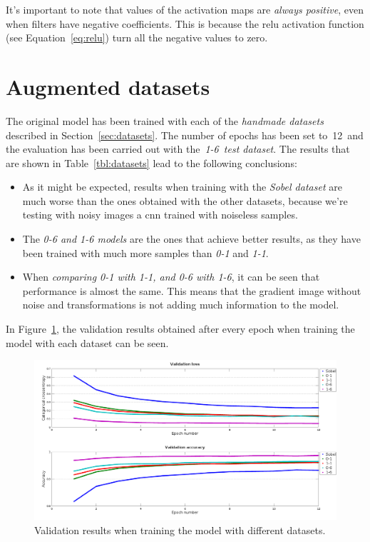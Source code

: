 It's important to note that values of the activation maps are \emph{always positive}, even when filters have negative coefficients. This is because the \gls{relu} activation function (see Equation~\ref{eq:relu}) turn all the negative values to zero.

\section{Augmented datasets}\label{sec:new_datasets}
The original model has been trained with each of the \emph{handmade datasets} described in Section~\ref{sec:datasets}. The number of epochs has been set to~12~and the evaluation has been carried out with the~\emph{1-6~test dataset}. The results that are shown in Table~\ref{tbl:datasets} lead to the following conclusions:
\begin{itemize}
	\item As it might be expected, results when training with the \emph{Sobel dataset} are much worse than the ones obtained with the other datasets, because we're testing with noisy images a \gls{cnn} trained with noiseless samples.
	\item The \emph{\textit{0-6} and \textit{1-6} models} are the ones that achieve better results, as they have been trained with much more samples than \textit{0-1} and \textit{1-1}.
	\item When \emph{comparing \textit{0-1} with \textit{1-1}, and \textit{0-6} with \textit{1-6}}, it can be seen that performance is almost the same. This means that the gradient image without noise and transformations is not adding much information to the model.
\end{itemize}
In Figure~\ref{fig:val_datasets}, the validation results obtained after every epoch when training the model with each dataset can be seen.
\begin{figure}
	\centering
	\includegraphics[width=1\linewidth, keepaspectratio]{figures/val_datasets.png}
	\caption{Validation results when training the model with different datasets.}
	\label{fig:val_datasets}
\end{figure}

